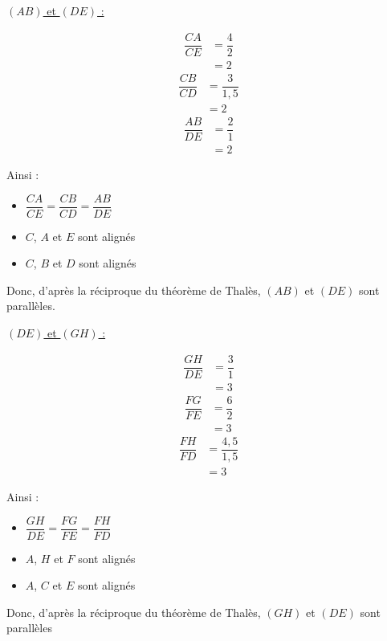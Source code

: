 \exo{}{}


\begin{multicols}{2}
  \underline{$(AB)$ et $(DE)$ :}

  \begin{multicols}{3}
    \noindent
    \begin{align*}
        \dfrac{CA}{CE}&=\dfrac{4}{2}\\
        &=2
    \end{align*}
    \begin{align*}
        \dfrac{CB}{CD}&=\dfrac{3}{1,5}\\
        &=2
    \end{align*}
    \begin{align*}
        \dfrac{AB}{DE}&=\dfrac{2}{1}\\
        &=2
    \end{align*}
  \end{multicols}
  \vspace{-1.75em }
  Ainsi :
  \begin{itemize}
      \item $\dfrac{CA}{CE}=\dfrac{CB}{CD}=\dfrac{AB}{DE}$\vspace{0.25em}
      \item $C$, $A$ et $E$ sont alignés
      \item $C$, $B$ et $D$ sont alignés
  \end{itemize}
  Donc, d'après la réciproque du théorème de Thalès, $(AB)$ et $(DE)$ sont parallèles.
    
  \underline{$(DE)$ et $(GH)$ :}

  \begin{multicols}{3}
    \noindent
    \begin{align*}
        \dfrac{GH}{DE}&=\dfrac{3}{1}\\
        &=3
    \end{align*}
    \begin{align*}
        \dfrac{FG}{FE}&=\dfrac{6}{2}\\
        &=3
    \end{align*}
    \begin{align*}
        \dfrac{FH}{FD}&=\dfrac{4,5}{1,5}\\
        &=3
    \end{align*}
  \end{multicols}
  \vspace{-1.75em }
  Ainsi :
  \begin{itemize}
      \item $\dfrac{GH}{DE}=\dfrac{FG}{FE}=\dfrac{FH}{FD}$\vspace{0.25em}
      \item $A$, $H$ et $F$ sont alignés
      \item $A$, $C$ et $E$ sont alignés
  \end{itemize}
  Donc, d'après la réciproque du théorème de Thalès, $(GH)$ et $(DE)$ sont parallèles
\end{multicols}